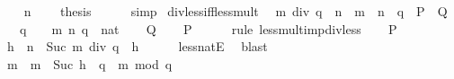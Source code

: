 \begin{isabellebody}
\ \ \isamarkupfalse%
\ {\isacartoucheopen}n\ {\isachargreater}{\kern0pt}\ {}{\isacartoucheclose}\ \isamarkupfalse%
\ {\isacharquery}{\kern0pt}thesis\isanewline
\ \ \ \ \isamarkupfalse%
\ simp\isanewline
{}\isamarkupfalse%
%
\endisatagproof
{\isafoldproof}%
%
\isadelimproof
\isanewline
%
\endisadelimproof
\isanewline
{}\isamarkupfalse%
\ div{\isacharunderscore}{\kern0pt}less{\isacharunderscore}{\kern0pt}iff{\isacharunderscore}{\kern0pt}less{\isacharunderscore}{\kern0pt}mult{\isacharcolon}{\kern0pt}\isanewline
\ \ {\isacartoucheopen}m\ div\ q\ {\isacharless}{\kern0pt}\ n\ {\isasymlongleftrightarrow}\ m\ {\isacharless}{\kern0pt}\ n\ {\isacharasterisk}{\kern0pt}\ q{\isacartoucheclose}\ {\isacharparenleft}{\kern0pt}\ {\isacartoucheopen}{\isacharquery}{\kern0pt}P\ {\isasymlongleftrightarrow}\ {\isacharquery}{\kern0pt}Q{\isacartoucheclose}{\isacharparenright}{\kern0pt}\isanewline
\ \ \ {\isacartoucheopen}q\ {\isachargreater}{\kern0pt}\ {}{\isacartoucheclose}\ \ m\ n\ q\ {\isacharcolon}{\kern0pt}{\isacharcolon}{\kern0pt}\ nat\isanewline
%
\isadelimproof
%
\endisadelimproof
%
\isatagproof
{}\isamarkupfalse%
\isanewline
\ \ \isamarkupfalse%
\ {\isacharquery}{\kern0pt}Q\ \isamarkupfalse%
\ \isamarkupfalse%
\ {\isacharquery}{\kern0pt}P\isanewline
\ \ \ \ \isamarkupfalse%
\ {\isacharparenleft}{\kern0pt}rule\ less{\isacharunderscore}{\kern0pt}mult{\isacharunderscore}{\kern0pt}imp{\isacharunderscore}{\kern0pt}div{\isacharunderscore}{\kern0pt}less{\isacharparenright}{\kern0pt}\isanewline
{}\isamarkupfalse%
\isanewline
\ \ \isamarkupfalse%
\ {\isacharquery}{\kern0pt}P\isanewline
\ \ \isamarkupfalse%
\ \isamarkupfalse%
\ h\ \ {\isacartoucheopen}n\ {\isacharequal}{\kern0pt}\ Suc\ {\isacharparenleft}{\kern0pt}m\ div\ q\ {\isacharplus}{\kern0pt}\ h{\isacharparenright}{\kern0pt}{\isacartoucheclose}\isanewline
\ \ \ \ \isamarkupfalse%
\ less{\isacharunderscore}{\kern0pt}natE\ \isamarkupfalse%
\ blast\isanewline
\ \ \isamarkupfalse%
\ \isamarkupfalse%
\ {\isacartoucheopen}m\ {\isacharless}{\kern0pt}\ m\ {\isacharplus}{\kern0pt}\ {\isacharparenleft}{\kern0pt}Suc\ h\ {\isacharasterisk}{\kern0pt}\ q\ {\isacharminus}{\kern0pt}\ m\ mod\ q{\isacharparenright}{\kern0pt}{\isacartoucheclose}\isanewline

\end{isabellebody}
